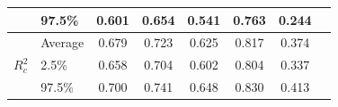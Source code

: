 \begin{table}[ht]
\begin{tabular}{@{}llcccccc@{}}
                                           & 97.5\%  & 0.601 & 0.654 & 0.541 & 0.763 & 0.244 \\ \midrule
      \multirow{3}{*}{$R^2_c$}            & Average & 0.679 & 0.723 & 0.625 & 0.817 & 0.374 \\
                                           & 2.5\%   & 0.658 & 0.704 & 0.602 & 0.804 & 0.337 \\
                                           & 97.5\%  & 0.700 & 0.741 & 0.648 & 0.830 & 0.413 \\ \bottomrule
    \end{tabular}

\end{table}
